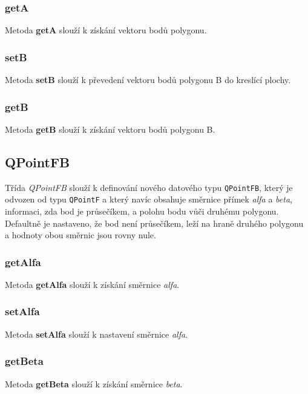 \documentclass[a4paper, 12pt]{article}
\begin{document}
\subsubsection*{getA}
Metoda \textbf{getA} slouží k získání vektoru bodů polygonu.

\subsubsection*{setB}
Metoda \textbf{setB} slouží k převedení vektoru bodů polygonu B do kreslící plochy.

\subsubsection*{getB}
Metoda \textbf{getB} slouží k získání vektoru bodů polygonu B.



\subsection{QPointFB}
Třída \textit{QPointFB} slouží k definování nového datového typu \texttt{QPointFB}, který je odvozen od typu \texttt{QPointF} a který navíc obsahuje směrnice přímek \textsl{alfa} a \textsl{beta}, informaci, zda bod je průsečíkem, a polohu bodu vůči druhému polygonu. Defaultně je nastaveno, že bod není průsečíkem, leží na hraně druhého polygonu a hodnoty obou směrnic jsou rovny nule.

\subsubsection*{getAlfa}
Metoda \textbf{getAlfa} slouží k získání směrnice \textsl{alfa}.

\subsubsection*{setAlfa}
Metoda \textbf{setAlfa} slouží k nastavení směrnice \textsl{alfa}. 

\subsubsection*{getBeta}
Metoda \textbf{getBeta} slouží k získání směrnice \textsl{beta}.
\end{document}
